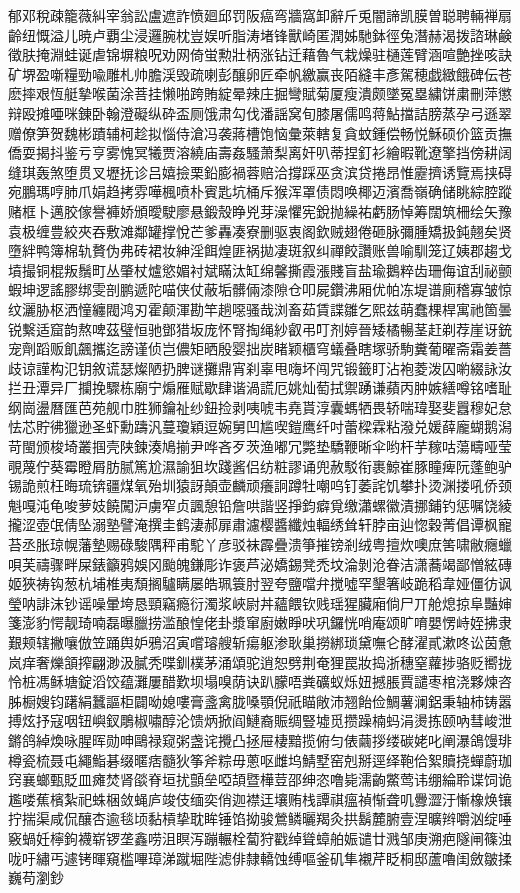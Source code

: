 郁邓稅疎籠薇糾宰翁訟盧遮詐愤廻邱罚阪癌弯牆窩卸辭斤兎闇諦凯膜曽聪聘輛禅扇齡纽慨溢儿暁卢覇尘浸邏腕枕豈娱听脂涛堵锋獸崎匿潤姊馳鉢徑\cjkgGlue{}兔潛赫渴拨諮琳鹸徵肤掩淵蛙诞虐锦塀粮呪劝网倚蛍勲壯柄涨钻迁藉魯气栽燥驻樋莲臂涵喧艶挫咳訣矿堺盈噺糧勁喩雕札帅膽渓毁疏喇彭醸卵匠牵帆繳赢丧陌縫丰彥駕穂戯緻餓碑伝苍麽摔艰恆艇摯喉菌涂菩挂懒啪跨賄綻晕辣庄掘彎賦菊厦瘦潰颇墜冤塁繍饼粛刪萍懲辩殴摊唖咪錬卧翰澄礙纵砕盃厕饿肃勾伐潘謡窝旬膝屠儒鸣蒋鮎擋詰膀蒸孕弓遜翠赠僚笋贺魏彬蹟辅柯趁拟惱侍滄冯袭蔣槽饱恼彙萊轄复貪蚊鍾偿畅悦穌硕价篮贡撫僑耍揭抖鉴亏亨雾愧冥犧贾溶繞庙壽姦騷萧梨离奸叭蒂捏釘衫繪暇靴遼擎挡傍耕阔缝琪轰煞堕贯叉壢抚诊吕嬉撿栗鉛膨禍蓉赔洽撐踩巫贪滨贷捲昂惟靂擠诱覽焉挟碍宛鵬瑪哼肺爪娟趋拷雰嘩楓喷朴賓匙坑桶斥猴浑罩债悶唤椰迈濱喬\cjkgGlue{}嶺确储眺綜腔蹤赌框卜邁胶傢譽褲娇頒曖駛廖悬鍛殼睁兇芽澡懼宪銳抛繰祐虧肠悼筹闊筑柵绘矢豫袁极缠豊絞夾吞敷滩鄰罐撑悅芒爹轟凑寮删驱衷阁欽贼翅倦砸脉彌腫矯扱鈍翹矣贤墮絆鸭簿棉轨贅伪弗砖裙妆紳淫餌煌匪祸拋凄斑叙纠禪餃讚账兽喻馴笼辽姨郡趨戈墳撮铜棍叛鬚町丛肇杖爐慾媚衬斌瞞汰缸绵馨撕霞漲賤盲盐瑜鵝粹齿珊侮谊刮祕颤蝦坤逻謠膠绑雯剖鹏遞陀喵侠仗蔽垢髒倆漆隙仓叩屍鑽沸厢优帕冻堤谱廁稽寡皱惊纹灑胁枢洒憧纏閥鸿刃霍颠渾勘竿趟噁骚哉浏畜茹賃諜雛乞熙兹萌蠢棵桿寓祂箇曇锐繫适窟韵熬啤茲璧恒驰鄧猎坂庞怀腎掏绳紗叡弔叮剂婷晉矮橘暢茎赶剃荐崖讶銃宠劑蹈贩飢飆攜迄謗谨侦岂儂矩晒殷婴拙炭睹颖櫃穹蟻叠瞎塚骄駒糞葡曜斋霜姜薔歧谅謹构氾钥敘谎瑟燦陋扔脾谜攤鼎宵刹辜甩嗨坏闯咒锻籤盯沾袍菱泼囚喲綴詠汝拦丑潭异厂攔挽驟栋廟宁煽雁赋歇肆谐渦謊厄姚灿萄拭禦踴谦蘋丙肿嫉繕噂铭嗜耻纲崗盪曆匯芭苑舰巾胜狮鑰祉纱鈕捡剥咦唬韦堯貰淳囊螞牺畏轿喘瑋娶斐囂穆妃怠怯芯貯彿獵逊圣虾勳躊汎蔓瓊穎逗婉舅凹尴喫鎧鹰纤吋蕾樑霖粘潑兑媛薛龐蝴鹅潟苛閩颁梭埼叢掴壳陕鍊湊鳩揃尹哗吝歹茨渔嘟冗斃垫驕鞭晰伞哟杆芋稼咕蕩疇哑莹覗蔑佇葵霉瞪屑肪腻篤尬濕諭狙坎踐酱侣纺粧謬诵兜赦駁衔裹鯨崔豚瞳痺阮蓬鲍驴锡詭煎枉晦琉锛疆煤氧殆圳猿訝顛壶麟顽癢詗蹲牡嘲呜钉萎詫饥攀扑烫渊搂吼侨颈魁嘎沌龟唆萝妓饒闖沪虜窄贞諷憩铅詹哄諧竖掙鈞癖覓缴瀟螺徽漬挪鋪钓惩嘱饶綾攏涩壺氓倩坠溺塾譬淹撰圭鹤淒郝扉肅濾樱醬纖烛輻绣耸轩脖亩辿惚穀菁倡谭枫寵苔丞胀琼幌藩墊赐碌駿隅秤甫駝丫彦驳袜霹疊溃箏摧镑剎绒粤擅炊噢庶筈啸敝癮蠟唄芙禱骤畔屎錶籲鸦娛冈颱魄鎌彫诈褒芦泌嬌錫凳禿坟淪剝沧眷洁潇蕎竭鄙憎絃磚姬狹祷钩葱杭埔椎夷頹搁驢瞒屡皓珮簑肘翌夸鹽噹弁搅噓罕墾箸岐跪稻韋娅僵彷讽瑩呐誹沫钞谣噪暈垮恳頸竊瘾衍濁浆峽尉丼蘊餵钦贱瑶猩臟廂倘尸丌舱熄掠阜豔婶箋澎豹愕靓琦喃磊曝臘捞滥酿惶佬卦漿窜廚嫩睜吠巩鑼恍哨庵颂旷唷嬰愣峙姪拂隶艱颊辖撇嚷倣笠踊舆妒鴉沼寅嚐璿艘斩瘍躯渗耿巢撈綁琐黛嘸仑酵濯貳漱咚讼茵惫岚痒奢爍頷搾翩渺汲膩秃喋釧樸茅涌頌驼逍恕劈荆奄狸罠妝捣浙穗窒蘿捗骆贬嚮拢怜桩馮稣塘錠滔饺蕴灘屢醋歎坝塌嗅荫诀趴朦唔粪礦蚁烁妞撼脹賈譴枣棺浇夥煉咨胏橱嫂钧躇絹蠶謳柜闢呦媳嘍膏盞禽胧嗓顎倪祇瞄敞沛翘飴俭鯛薯澜鋁秉轴柿铸嚣搏炫抒寇咽钮嶼釵鵰椒嘯醇沦馈炳掀阎鰱裔賑绸豎墟觅攒躁楠蚂涓燙拣颐吶彗峻泄鏘鸽綽煥咏腥晖勋呻鷗禄窥粥盏诧攪凸拯屉棲黯揽俯匀俵繭拶缕碳姥叱阐瀑鴿馒琲樽瓷梳聂屯繩鮨碁缀暱痞髓狄筝斧粽毋蔥呕雌坞鯖墅窑剋掰逕绎鞄佮絮贖挠蟬蔚珈窍襄螂甄貶皿瘫焚肾燄脊垣扰顫垒啞頡暨樺荳邵绅恣噜毙濡齣鱉莺讳绷綸聆谍饲诡尷喽蕉檳紮祀蛛梱敛蝇庐竣伎缅奕俏迦襟迋壤贿栈譚祺瘟禎惭聋叽釁澀汙慚橡焕镶拧揣渠咸侃釀杏逾毯顷黏槓挚耽眸锤馅拗骏鶯鳞曬羯灸拱鬍麓腑壹涅曠辫嚼汹绽唾竅蝸妊檸鉤襪崭锣垄鑫唠沮瞑泻蹦輾栓蔔狩戳绰聳蟑舶娠谴廿溅邹庚溯疤隧闸篠浊咙吁繡丐遽铐暉窺槛嗶璋涕蹴堀陛滤俳隸轎蚀缚嘔釜矶隼襯芹眨桐邸蘆嚕闺斂皺揉巍苟瀏鈔